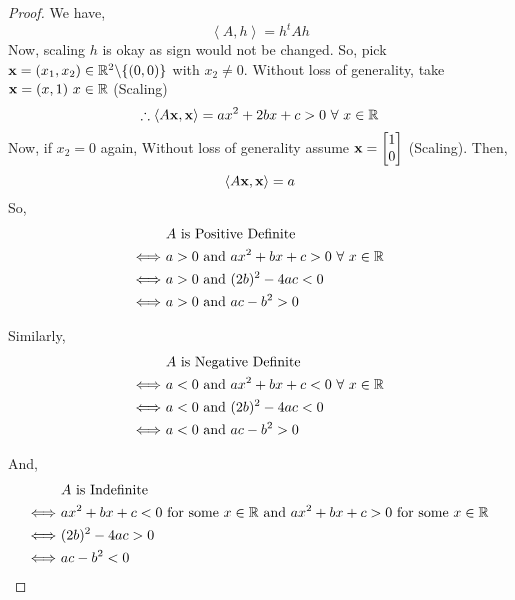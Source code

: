 \documentclass[../Analysis-3.tex]{subfiles}
\begin{document}
\begin{proof}
  We have, \[ \left\langle A, h \right\rangle = h^tAh \]
  Now, scaling $h$ is okay as sign would not be changed. So, pick ${\bf x} = (x_1, x_2) \in \mathbb{R}^2 \backslash \{(0,0)\} $ with $x_2 \neq 0$.
  Without loss of generality, take ${\bf x} = (x,1) \ x \in \mathbb{R}$ (Scaling) \\
  \[ \therefore \left\langle A\bf{x}, \bf{x} \right\rangle = ax^2 + 2bx + c > 0 \ \forall\ x \in \mathbb{R} \]
  Now, if $x_2 = 0$ again, Without loss of generality assume ${\bf x} = \begin{bmatrix}
      1 \\
      0
    \end{bmatrix}$ (Scaling). Then, \[ \left\langle A\bf{x}, \bf{x} \right\rangle = a \]
  So,
  \begin{align*}
                        & \ A \text{ is Positive Definite}                         \\
    \Longleftrightarrow & \ a > 0 \text{ and } ax^2 + bx+c > 0 \ \forall\ x \in \mathbb{R} \\
    \Longleftrightarrow & \ a > 0 \text{ and } (2b)^2 - 4ac < 0                    \\
    \Longleftrightarrow & \ a > 0 \text{ and } ac - b^2 > 0
  \end{align*}

  Similarly,
  \begin{align*}
                        & \ A \text{ is Negative Definite}                         \\
    \Longleftrightarrow & \ a < 0 \text{ and } ax^2 + bx+c < 0 \ \forall\ x \in \mathbb{R} \\
    \Longleftrightarrow & \ a < 0 \text{ and } (2b)^2 - 4ac < 0                    \\
    \Longleftrightarrow & \ a < 0 \text{ and } ac - b^2 > 0
  \end{align*}

  And,
  \begin{align*}
                        & \ A \text{ is Indefinite}                                                                              \\
    \Longleftrightarrow & \ ax^2 + bx+c < 0 \ \text{for some } x \in \mathbb{R} \text{ and } ax^2 + bx+c > 0 \ \text{for some } x \in \mathbb{R} \\
    \Longleftrightarrow & \ (2b)^2 - 4ac > 0                                                                                     \\
    \Longleftrightarrow & \ ac - b^2 < 0
  \end{align*}
\end{proof}
\end{document}
